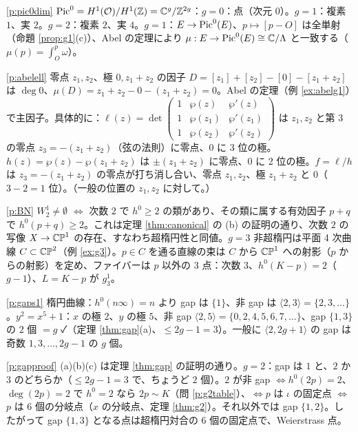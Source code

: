 \begin{sol}{\ref{p:pic0dim}}
$\mathrm{Pic}^0=H^1(\mathcal O)/H^1(\mathbb Z)=\mathbb C^g/\mathbb Z^{2g}$：$g=0$：点（次元 $0$）。$g=1$：複素 $1$、実 $2$。$g=2$：複素 $2$、実 $4$。$g=1$：$E\to\mathrm{Pic}^0(E)$、$p\mapsto[p-O]$ は全単射（命題 \ref{prop:g1}(c)）、Abel の定理により $\mu:E\to\mathrm{Pic}^0(E)\cong\mathbb C/\Lambda$ と一致する（$\mu(p)=\int_O^p\omega$）。
\end{sol}
\begin{sol}{\ref{p:abelell}}
零点 $z_1,z_2$、極 $0,z_1+z_2$ の因子 $D=[z_1]+[z_2]-[0]-[z_1+z_2]$ は $\deg0$、$\mu(D)=z_1+z_2-0-(z_1+z_2)=0$。Abel の定理（例 \ref{ex:abelg1}）で主因子。具体的に：$\ell(z)=\det\begin{pmatrix}1&\wp(z)&\wp'(z)\\1&\wp(z_1)&\wp'(z_1)\\1&\wp(z_2)&\wp'(z_2)\end{pmatrix}$ は $z_1,z_2$ と第 3 の零点 $z_3=-(z_1+z_2)$（弦の法則）に零点、$0$ に 3 位の極。$h(z)=\wp(z)-\wp(z_1+z_2)$ は $\pm(z_1+z_2)$ に零点、$0$ に 2 位の極。$f=\ell/h$ は $z_3=-(z_1+z_2)$ の零点が打ち消し合い、零点 $z_1,z_2$、極 $z_1+z_2$ と $0$（$3-2=1$ 位）。（一般の位置の $z_1,z_2$ に対して。）
\end{sol}
\begin{sol}{\ref{p:BN}}
$W^1_2\ne\emptyset$ $\iff$ 次数 $2$ で $h^0\ge2$ の類があり、その類に属する有効因子 $p+q$ で $h^0(p+q)\ge2$。これは定理 \ref{thm:canonical} の (b) の証明の通り、次数 $2$ の写像 $X\to\mathbb{CP}^1$ の存在、すなわち超楕円性と同値。$g=3$ 非超楕円は平面 4 次曲線 $C\subset\mathbb{CP}^2$（例 \ref{ex:g3}）。$p\in C$ を通る直線の束は $C$ から $\mathbb{CP}^1$ への射影（$p$ からの射影）を定め、ファイバーは $p$ 以外の 3 点：次数 $3$、$h^0(K-p)=2$（$g-1$）、$L=K-p$ が $g^1_3$。
\end{sol}
\begin{sol}{\ref{p:gaps1}}
楕円曲線：$h^0(n\infty)=n$ より gap は $\{1\}$、非 gap は $\langle2,3\rangle=\{2,3,\dots\}$。$y^2=x^5+1$：$x$ の極 $2$、$y$ の極 $5$、非 gap $\langle2,5\rangle=\{0,2,4,5,6,7,\dots\}$、gap $\{1,3\}$ の $2$ 個 $=g$ ✓（定理 \ref{thm:gap}(a)、$\le2g-1=3$）。一般に $\langle2,2g+1\rangle$ の gap は奇数 $1,3,\dots,2g-1$ の $g$ 個。
\end{sol}
\begin{sol}{\ref{p:gapproof}}
(a)(b)(c) は定理 \ref{thm:gap} の証明の通り。$g=2$：gap は $1$ と、$2$ か $3$ のどちらか（$\le2g-1=3$ で、ちょうど $2$ 個）。$2$ が非 gap $\iff h^0(2p)=2$、$\deg(2p)=2$ で $h^0=2$ なら $2p\sim K$（問 \ref{p:g2table}）、$\iff p$ は $\iota$ の固定点 $\iff$ $p$ は 6 個の分岐点（$x$ の分岐点、定理 \ref{thm:g2}）。それ以外では gap $\{1,2\}$。したがって gap $\{1,3\}$ となる点は超楕円対合の 6 個の固定点で、Weierstrass 点。
\end{sol}

